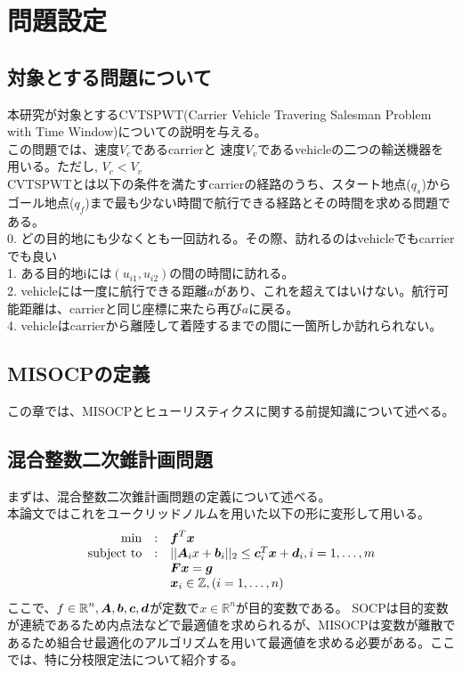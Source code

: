 \documentclass[11pt,a4paper,dvipdfmx,titlepage,uplatex]{jsarticle}
\theoremstyle{mystyle}
\newcommand{\0}{\mathbf{0}}
\def\b{\mbox{\boldmath $b$}}
\def\c{\mbox{\boldmath $c$}}
\def\d{\mbox{\boldmath $d$}}
\def\f{\mbox{\boldmath $f$}}
\def\g{\mbox{\boldmath $g$}}
\def\x{\mbox{\boldmath $x$}}
\def\A{\mbox{\boldmath $A$}}
\def\F{\mbox{\boldmath $F$}}
\def\Real{\mbox{$\mathbb{R}$}}
\begin{document}
\section{問題設定}\label{sec:Second_Order_Cone_Programming_without_interiorpoint}
\subsection{対象とする問題について}\label{sec:problem_settings}
本研究が対象とするCVTSPWT(Carrier Vehicle Travering Salesman Problem with Time Window)についての説明を与える。\\
この問題では、速度$V_c$であるcarrierと 速度$V_v$であるvehicleの二つの輸送機器を用いる。ただし, $V_c< V_v$\\
CVTSPWTとは以下の条件を満たすcarrierの経路のうち、スタート地点($q_s$)からゴール地点($q_f$)まで最も少ない時間で航行できる経路とその時間を求める問題である。\\
0. どの目的地にも少なくとも一回訪れる。その際、訪れるのはvehicleでもcarrierでも良い\\
1. ある目的地iには$(u_{i1}, u_{i2})$の間の時間に訪れる。\\
2. vehicleには一度に航行できる距離$a$があり、これを超えてはいけない。航行可能距離は、carrierと同じ座標に来たら再び$a$に戻る。\\
4. vehicleはcarrierから離陸して着陸するまでの間に一箇所しか訪れられない。

\subsection{MISOCPの定義}
この章では、MISOCPとヒューリスティクスに関する前提知識について述べる。

\subsection{混合整数二次錐計画問題}\label{sec:Second_Order_Cone_Programming}

まずは、混合整数二次錐計画問題の定義について述べる。\\
本論文ではこれをユークリッドノルムを用いた以下の形に変形して用いる。
\begin{align}
	\begin{array}{rcl}
		\min & : & \f ^T\x \\
		\text{subject to} & : &||\A_i x +\b_i||_2 \leq \c_i^T\x+\d_i, i = 1,\dots, m \\
		& & \F\x=\g\\
		& & \x_i \in \mathbb{Z}, (i=1,\dots, n)
	\end{array}
\end{align}
ここで、$f \in \Real^n , \A, \b, \c, \d$が定数で$x \in \Real^n$が目的変数である。
SOCPは目的変数が連続であるため内点法などで最適値を求められるが、MISOCPは変数が離散であるため組合せ最適化のアルゴリズムを用いて最適値を求める必要がある。ここでは、特に分枝限定法について紹介する。
\end{document}
